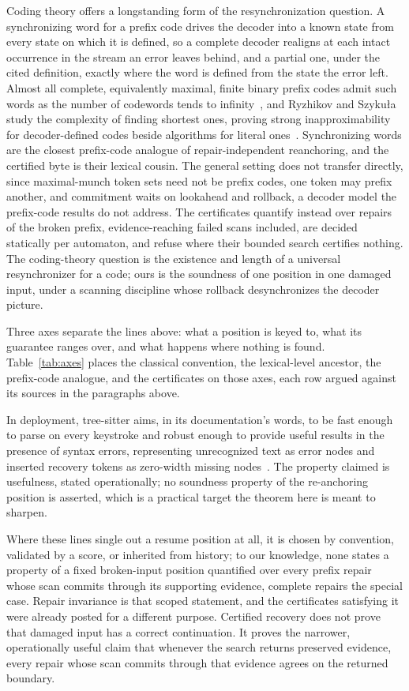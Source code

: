 \documentclass[11pt,a4paper]{article}
\theoremstyle{definition}
\theoremstyle{plain}
\theoremstyle{remark}
\begin{document}
Coding theory offers a longstanding form of the resynchronization question. A synchronizing word for a prefix code
drives the decoder into a known state from every state on which it is defined, so a complete decoder realigns at each
intact occurrence in the stream an error leaves behind, and a partial one, under the cited definition, exactly where the
word is defined from the state the error left. Almost all complete, equivalently maximal, finite binary prefix codes
admit such words as the number of codewords tends to infinity~\citep{freiling2003sync}, and Ryzhikov and Szyku{\l}a
study the complexity of finding shortest ones, proving strong inapproximability for decoder-defined codes beside
algorithms for literal ones~\citep{ryzhikov2018sync}. Synchronizing words are the closest prefix-code analogue of
repair-independent reanchoring, and the certified byte is their lexical cousin. The general setting does not transfer
directly, since maximal-munch token sets need not be prefix codes, one token may prefix another, and commitment waits on
lookahead and rollback, a decoder model the prefix-code results do not address. The certificates quantify instead over
repairs of the broken prefix, evidence-reaching failed scans included, are decided statically per automaton, and refuse
where their bounded search certifies nothing. The coding-theory question is the existence and length of a universal
resynchronizer for a code; ours is the soundness of one position in one damaged input, under a scanning discipline whose
rollback desynchronizes the decoder picture.

Three axes separate the lines above: what a position is keyed to, what its guarantee ranges over, and what happens where
nothing is found. Table~\ref{tab:axes} places the classical convention, the lexical-level ancestor, the prefix-code
analogue, and the certificates on those axes, each row argued against its sources in the paragraphs above.


In deployment, tree-sitter aims, in its documentation's words, to be fast enough to parse on every keystroke and robust
enough to provide useful results in the presence of syntax errors, representing unrecognized text as error nodes and
inserted recovery tokens as zero-width missing nodes~\citep{treesitter}. The property claimed is usefulness, stated
operationally; no soundness property of the re-anchoring position is asserted, which is a practical target the theorem
here is meant to sharpen.

Where these lines single out a resume position at all, it is chosen by convention, validated by a score, or inherited
from history; to our knowledge, none states a property of a fixed broken-input position quantified over every prefix
repair whose scan commits through its supporting evidence, complete repairs the special case. Repair invariance is that
scoped statement, and the certificates satisfying it were already posted for a different purpose. Certified recovery
does not prove that damaged input has a correct continuation. It proves the narrower, operationally useful claim that
whenever the search returns preserved evidence, every repair whose scan commits through that evidence agrees on the
returned boundary.
\end{document}
